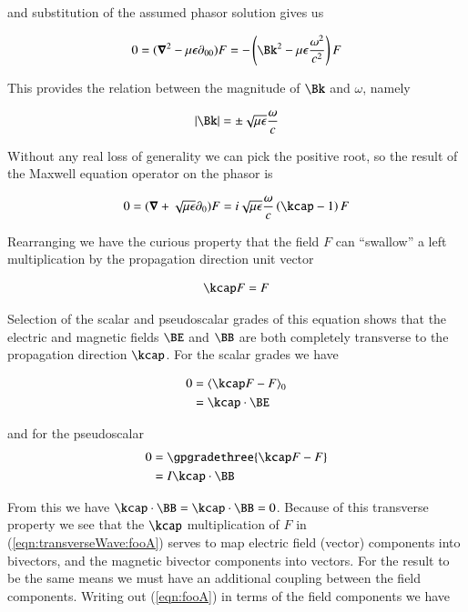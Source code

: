 and substitution of the assumed phasor solution gives us

\begin{align}\label{eqn:transverseWave:foo7}
0 = (\spacegrad^2 - {\mu\epsilon}\partial_{00}) F = -\left( \Bk^2 - {\mu\epsilon}\frac{\omega^2}{c^2} \right) F 
\end{align}

This provides the relation between the magnitude of $\Bk$ and $\omega$, namely

\begin{align}\label{eqn:transverseWave:foo8}
\Abs{\Bk} = \pm \sqrt{\mu\epsilon}\frac{\omega}{c} 
\end{align}

Without any real loss of generality we can pick the positive root, so the result of the Maxwell equation operator on the phasor is

\begin{align}\label{eqn:transverseWave:foo5}
0 = (\spacegrad + \sqrt{\mu\epsilon}\partial_0) F = i \sqrt{\mu\epsilon}\frac{\omega}{c} \left( \kcap - 1\right) F 
\end{align}

Rearranging we have the curious property that the field $F$ can ``swallow'' a left multiplication by the propagation direction unit vector 

\begin{align}\label{eqn:transverseWave:fooA}
\kcap F = F 
\end{align}

Selection of the scalar and pseudoscalar grades of this equation shows that the electric and magnetic fields $\BE$ and $\BB$ are both completely transverse to the propagation direction $\kcap$.  For the scalar grades we have

\begin{align*}
0 &= \gpgradezero{\kcap F - F} \\
  &= \kcap \cdot \BE
\end{align*}

and for the pseudoscalar
\begin{align*}
0 &= \gpgradethree{\kcap F - F} \\
  &= I \kcap \cdot \BB
\end{align*}

From this we have $\kcap \cdot \BB = \kcap \cdot \BB = 0$.  Because of this transverse property we see that the $\kcap$ multiplication of $F$ in (\ref{eqn:transverseWave:fooA}) serves to map electric field (vector) components into bivectors, and the magnetic bivector components into vectors.  For the result to be the same means we must have an additional coupling between the field components.  Writing out (\ref{eqn:fooA}) in terms of the field components we have

